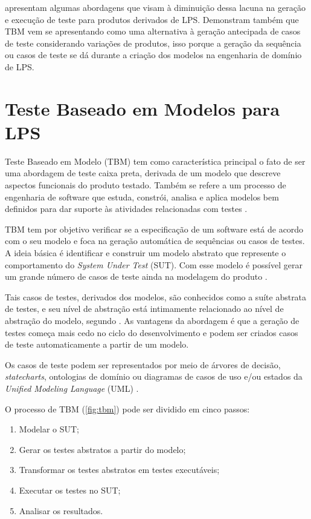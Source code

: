 \citet{do2014strategies} apresentam algumas abordagens que visam à diminuição dessa lacuna na geração e execução de teste para produtos derivados de LPS. Demonstram também que TBM vem se apresentando como uma alternativa à geração antecipada de casos de teste considerando variações de produtos, isso porque a geração da sequência ou casos de teste se dá durante a criação dos modelos na engenharia de domínio de LPS. 


\section{Teste Baseado em Modelos para LPS}
\label{cap2sec:teste_tbm_lps}

Teste Baseado em Modelo (TBM) tem como característica principal o fato de ser uma abordagem de teste caixa preta, derivada de um modelo que descreve aspectos funcionais do produto testado. Também se refere a um processo de engenharia de software que estuda, constrói, analisa e aplica modelos bem definidos para dar suporte às atividades relacionadas com testes \cite{shafique2010systematic}.

TBM tem por objetivo verificar se a especificação de um software está de acordo com o seu modelo e foca na geração automática de sequências ou casos de testes. A ideia básica é identificar e construir um modelo abstrato que represente o comportamento do \textit{System Under Test} (SUT). Com esse modelo é possível gerar um grande número de casos de teste ainda na modelagem do produto \cite{devroey2014behavioural}. 

Tais casos de testes, derivados dos modelos, são conhecidos como a suíte abstrata de testes, e seu nível de abstração está intimamente relacionado ao nível de abstração do modelo, segundo \citet{do2014strategies}. As vantagens da abordagem é que a geração de testes começa mais cedo no ciclo do desenvolvimento e podem ser criados casos de teste automaticamente a partir de um modelo. 

Os casos de teste podem ser representados por meio de árvores de decisão, \textit{statecharts}, ontologias de domínio ou diagramas de casos de uso e/ou estados da \textit{Unified Modeling Language} (UML) \cite{isa2017model}.

O processo de TBM (\ref{fig:tbm}) pode ser dividido em cinco passos:

\begin{enumerate}
	\item Modelar o SUT;
	\item Gerar os testes abstratos a partir do modelo;
	\item Transformar os testes abstratos em testes executáveis;
	\item Executar os testes no SUT;
	\item Analisar os resultados.
\end{enumerate}
 
